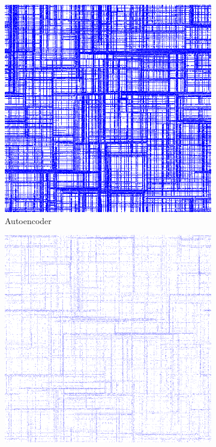 \begin{figure}[th]
\begin{subfigure}{.48\linewidth}
  \centering
  \includegraphics[width=\linewidth]
  {figures/3904718678772130032_autoencoder/3904718678772130032_autoencoder-20.png}
  \caption{\label{fig:autoencoder_cg1}Autoencoder}
\end{subfigure}
\begin{subfigure}{.48\linewidth}
  \centering
  \includegraphics[width=\linewidth]{figures/3904718678772130032_coarsed/3904718678772130032_coarsed-20.png}

\end{subfigure}
\end{figure}
